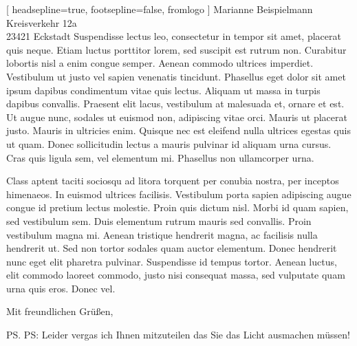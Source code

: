 \documentclass[version=last, fontsize=12pt]{scrlttr2}   %
\begin{document}
\begin{letter}[%
    headsepline=true,%
    footsepline=false,%
    fromlogo%
]{%
    Marianne Beispielmann\\
    Kreisverkehr 12a\\
    23421 Eckstadt%
}
Suspendisse lectus leo, consectetur in tempor sit amet, placerat quis neque. Etiam luctus porttitor lorem, sed suscipit est rutrum non. Curabitur lobortis nisl a enim congue semper. Aenean commodo ultrices imperdiet. Vestibulum ut justo vel sapien venenatis tincidunt. Phasellus eget dolor sit amet ipsum dapibus condimentum vitae quis lectus. Aliquam ut massa in turpis dapibus convallis. Praesent elit lacus, vestibulum at malesuada et, ornare et est. Ut augue nunc, sodales ut euismod non, adipiscing vitae orci. Mauris ut placerat justo. Mauris in ultricies enim. Quisque nec est eleifend nulla ultrices egestas quis ut quam. Donec sollicitudin lectus a mauris pulvinar id aliquam urna cursus. Cras quis ligula sem, vel elementum mi. Phasellus non ullamcorper urna.

Class aptent taciti sociosqu ad litora torquent per conubia nostra, per inceptos himenaeos. In euismod ultrices facilisis. Vestibulum porta sapien adipiscing augue congue id pretium lectus molestie. Proin quis dictum nisl. Morbi id quam sapien, sed vestibulum sem. Duis elementum rutrum mauris sed convallis. Proin vestibulum magna mi. Aenean tristique hendrerit magna, ac facilisis nulla hendrerit ut. Sed non tortor sodales quam auctor elementum. Donec hendrerit nunc eget elit pharetra pulvinar. Suspendisse id tempus tortor. Aenean luctus, elit commodo laoreet commodo, justo nisi consequat massa, sed vulputate quam urna quis eros. Donec vel.

\closing{Mit freundlichen Grüßen,}

\ps PS: Leider vergas ich Ihnen mitzuteilen das Sie das Licht ausmachen müssen!


\end{letter}
\end{document}
